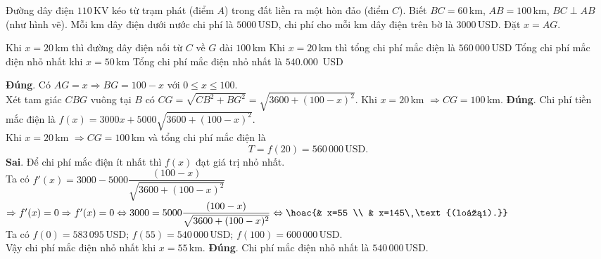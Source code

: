 \begin{ex}%
Đường dây điện $110\,$KV kéo từ trạm phát (điểm $A$) trong đất liền ra một hòn đảo (điểm $C$). Biết $B C=60\,$km, $A B=100\,$km, $BC\perp AB$ (như hình vẽ). Mỗi km dây điện dưới nước chi phí là $5000\,$USD, chi phí cho mỗi km dây điện trên bờ là $3000\,$USD. Đặt $x=A G$.
\begin{center}
\end{center}
\choiceTF
{\True Khi $x=20\,$km thì đường dây điện nối từ $C$ về $G$ dài $100\,$km}
{\True Khi $x=20\,$km thì tổng chi phí mắc điện là $560\,000\,$USD}
{Tổng chi phí mắc điện nhỏ nhất khi $x=50\,$km}
{\True Tổng chi phí mắc điện nhỏ nhất là $540.000\,$ USD}
\loigiai
{
\begin{itemchoice}
	\itemch \textbf{Đúng}. Có $AG=x \Rightarrow BG=100-x$ với $0 \leq x \leq 100$.\\			
	Xét tam giác $CBG$ vuông tại $B$ có $CG=\sqrt{CB^2+BG^2}=\sqrt{3600+(100-x)^2}$.
	Khi $x=20\,$km $\Rightarrow CG=100\,$km.
	\itemch \textbf{Đúng}. Chi phí tiền mắc điện là $f(x)=3000 x+5000\sqrt{3600+(100-x)^2}$.\\			
	Khi $x=20\,$km $\Rightarrow C G=100\,$km và tổng chi phí mắc điện là $$T=f(20)=560\, 000\,\text{USD}.$$
	\itemch \textbf{Sai}. Để chi phí mắc điện ít nhất thì $f(x)$ đạt giá trị nhỏ nhất.\\
	Ta có $f'(x)=3000-5000 \dfrac{(100-x)}{\sqrt{3600+(100-x)^2}}$\\
	$\Rightarrow f'(x)=0 \Rightarrow f'(x)=0 \Leftrightarrow 3000=5000 \dfrac{(100-x)}{\sqrt{3600+(100-x)^2}} \Leftrightarrow\hoac{& x=55 \\ & x=145\ \text{(loại).}}$\\			
	Ta có $f(0)=583\,095\,$USD; $f(55)=540\,000\,$USD; $f(100)=600\,000\,$USD.\\
	Vậy chi phí mắc điện nhỏ nhất khi $x=55\,$km.
	\itemch \textbf{Đúng}. Chi phí mắc điện nhỏ nhất là $540\,000\,$USD. 
\end{itemchoice}
}
\end{ex}

